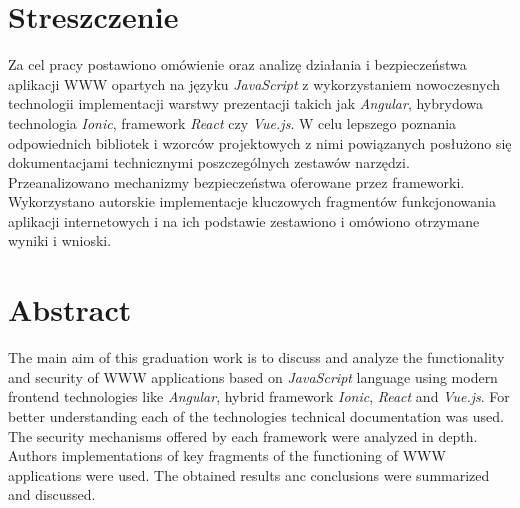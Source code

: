 \section*{\fontsize{16}{1}\selectfont Streszczenie}
Za cel pracy postawiono omówienie oraz analizę działania i bezpieczeństwa aplikacji WWW opartych na języku \textit{JavaScript} z wykorzystaniem nowoczesnych technologii implementacji warstwy prezentacji takich jak \textit{Angular}, hybrydowa technologia \textit{Ionic}, framework \textit{React} czy \textit{Vue.js}. W celu lepszego poznania odpowiednich bibliotek i wzorców projektowych z nimi powiązanych posłużono się dokumentacjami technicznymi poszczególnych zestawów narzędzi. Przeanalizowano mechanizmy bezpieczeństwa oferowane przez frameworki. Wykorzystano autorskie implementacje kluczowych fragmentów funkcjonowania aplikacji internetowych i na ich podstawie zestawiono i omówiono otrzymane wyniki i wnioski. 

\section*{\fontsize{16}{1}\selectfont Abstract}
The main aim of this graduation work is to discuss and analyze the functionality and security of WWW applications based on \textit{JavaScript} language using modern frontend technologies like \textit{Angular}, hybrid framework \textit{Ionic}, \textit{React} and \textit{Vue.js}. For better understanding each of the technologies technical documentation was used. The security mechanisms offered by each framework were analyzed in depth. Authors implementations of key fragments of the functioning of WWW applications were used. The obtained results anc conclusions were summarized and discussed. 
